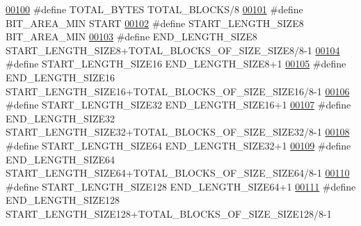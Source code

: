 \begin{DoxyCode}
{\hypertarget{memory_management_8h_source_l00100}{}\hyperlink{memory_management_8h_a4f417489d9c3c243405dffcd9e29c218}{00100} \textcolor{preprocessor}{#define TOTAL\_BYTES                       TOTAL\_BLOCKS/8}
\hypertarget{memory_management_8h_source_l00101}{}\hyperlink{memory_management_8h_a723777312fb96443b4370db291eee783}{00101} \textcolor{preprocessor}{#define BIT\_AREA\_MIN                      START}
\hypertarget{memory_management_8h_source_l00102}{}\hyperlink{memory_management_8h_a8a5cbd0409f2d6df8561b1bb395a7f46}{00102} \textcolor{preprocessor}{#define START\_LENGTH\_SIZE8                BIT\_AREA\_MIN}
\hypertarget{memory_management_8h_source_l00103}{}\hyperlink{memory_management_8h_a6af6fefe4b22528911f2ce074fb975a4}{00103} \textcolor{preprocessor}{#define END\_LENGTH\_SIZE8                  START\_LENGTH\_SIZE8+TOTAL\_BLOCKS\_OF\_SIZE\_SIZE8/8-1}
\hypertarget{memory_management_8h_source_l00104}{}\hyperlink{memory_management_8h_a2f29c04238fb0c1f4a7ec6c9bf9f6944}{00104} \textcolor{preprocessor}{#define START\_LENGTH\_SIZE16               END\_LENGTH\_SIZE8+1}
\hypertarget{memory_management_8h_source_l00105}{}\hyperlink{memory_management_8h_a3b353c267661a15d55f52511dceff059}{00105} \textcolor{preprocessor}{#define END\_LENGTH\_SIZE16                 START\_LENGTH\_SIZE16+TOTAL\_BLOCKS\_OF\_SIZE\_SIZE16/8-1}
\hypertarget{memory_management_8h_source_l00106}{}\hyperlink{memory_management_8h_a29b32c59a32f53431c6f431a1bd019fb}{00106} \textcolor{preprocessor}{#define START\_LENGTH\_SIZE32               END\_LENGTH\_SIZE16+1}
\hypertarget{memory_management_8h_source_l00107}{}\hyperlink{memory_management_8h_a5f9a300d4d1fb14f439a2e162cd4158e}{00107} \textcolor{preprocessor}{#define END\_LENGTH\_SIZE32                 START\_LENGTH\_SIZE32+TOTAL\_BLOCKS\_OF\_SIZE\_SIZE32/8-1}
\hypertarget{memory_management_8h_source_l00108}{}\hyperlink{memory_management_8h_ab9da1bb704226b0a20de81f1f5a77267}{00108} \textcolor{preprocessor}{#define START\_LENGTH\_SIZE64               END\_LENGTH\_SIZE32+1}
\hypertarget{memory_management_8h_source_l00109}{}\hyperlink{memory_management_8h_aaf1f709910644fb6fb9d661a0fae62b3}{00109} \textcolor{preprocessor}{#define END\_LENGTH\_SIZE64                 START\_LENGTH\_SIZE64+TOTAL\_BLOCKS\_OF\_SIZE\_SIZE64/8-1}
\hypertarget{memory_management_8h_source_l00110}{}\hyperlink{memory_management_8h_a6b18aa93bd5b19fb60d8d909915a4f5f}{00110} \textcolor{preprocessor}{#define START\_LENGTH\_SIZE128              END\_LENGTH\_SIZE64+1}
\hypertarget{memory_management_8h_source_l00111}{}\hyperlink{memory_management_8h_a77a1a07cb6579370e1099f1dfa289f7e}{00111} \textcolor{preprocessor}{#define END\_LENGTH\_SIZE128                START\_LENGTH\_SIZE128+TOTAL\_BLOCKS\_OF\_SIZE\_SIZE128/8-1}
}
\end{DoxyCode}
